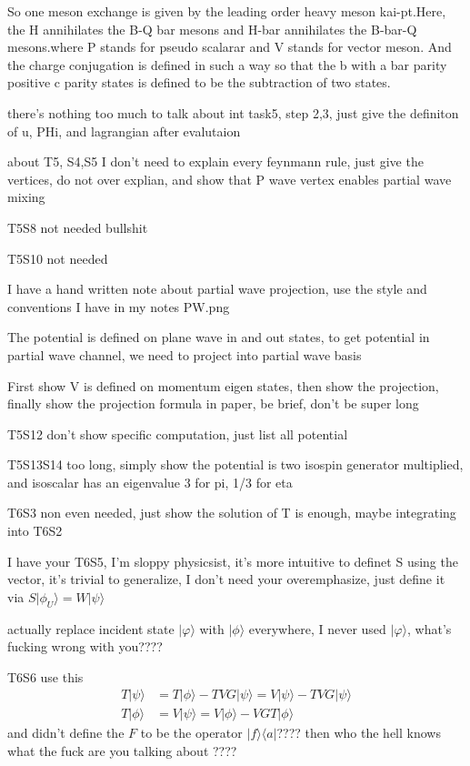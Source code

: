 \documentclass[11pt,a4paper]{article}
\newcommand{\draftcue}[1]{\begin{private}#1\end{private}}
\begin{document}
So one meson exchange is given by the leading order heavy meson kai-pt.Here, the H annihilates the B-Q bar mesons and H-bar annihilates the B-bar-Q mesons.where P stands for pseudo scalarar and V stands for vector meson. And the charge conjugation is defined in such a way so that the b with a bar parity positive c parity states is defined to be the subtraction of two states.

\draftcue{there's nothing too much to talk about int task5, step 2,3, just give the definiton of u, PHi, and lagrangian after evalutaion}

\draftcue{about T5, S4,S5 I don't need to explain every feynmann rule, just give the vertices, do not over explian, and show that P wave vertex enables partial wave mixing}

\draftcue{T5S8 not needed bullshit}

\draftcue{T5S10 not needed}

\draftcue{I have a hand written note about partial wave projection, use the style and conventions I have in my notes PW.png} The potential is defined on plane wave in and out states, to get potential in partial wave channel, we need to project into partial wave basis \draftcue{First show V is defined on momentum eigen states, then show the projection, finally show the projection formula in paper, be brief, don't be super long}

\draftcue{T5S12 don't show specific computation, just list all potential}

\draftcue{T5S13S14 too long, simply show the potential is two isospin generator multiplied, and isoscalar has an eigenvalue 3 for pi, 1/3 for eta}

\draftcue{T6S3 non even needed, just show the solution of T is enough, maybe integrating into T6S2}

\draftcue{I have your T6S5, I'm sloppy physicsist, it's more intuitive to definet S using the vector, it's trivial to generalize, I don't need your overemphasize, just define it via $S\lvert \phi_U \rangle = W\lvert \psi \rangle$}

\draftcue{actually replace incident state $\lvert \varphi \rangle$ with $\lvert \phi \rangle$ everywhere, I never used $\lvert \varphi \rangle$, what's fucking wrong with you????}

\draftcue{T6S6 use this
	\begin{align}
		T\lvert \psi \rangle & = T\lvert \phi \rangle - TVG\lvert \psi \rangle = V\lvert \psi \rangle - TVG\lvert \psi \rangle \\
		T\lvert \phi \rangle & = V\lvert \psi \rangle = V\lvert \phi \rangle - VGT\lvert \phi \rangle
	\end{align}
	and didn't define the $F$ to be the operator $\lvert f \rangle\langle a \rvert$???? then who the hell knows what the fuck are you talking about ????
}
\end{document}
